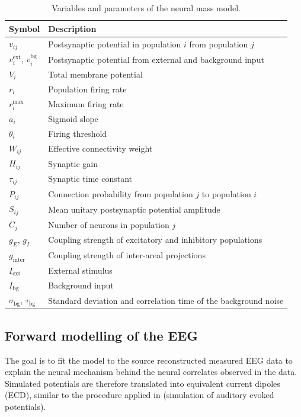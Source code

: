 \documentclass[11pt,a4paper,onecolumn]{article}
\begin{document}
\begin{table}[H]
\caption{Variables and parameters of the neural mass model.}
\label{tab:symbols}
\centering
\begin{tabular}{ll}
\toprule
Symbol & Description\\
\midrule
$v_{ij}$ & Postsynaptic potential in population $i$ from population $j$\\
$v_i^{\mathrm{ext}}$, $v_i^{\mathrm{bg}}$ & Postsynaptic potential from external and background input\\
$V_i$ & Total membrane potential\\
$r_i$ & Population firing rate\\
$r_i^{\max}$ & Maximum firing rate\\
$a_i$ & Sigmoid slope\\
$\theta_i$ & Firing threshold\\
$W_{ij}$ & Effective connectivity weight\\
$H_{ij}$ & Synaptic gain\\
$\tau_{ij}$ & Synaptic time constant\\
$P_{ij}$ & Connection probability from population $j$ to population $i$\\
$S_{ij}$ & Mean unitary postsynaptic potential amplitude\\
$C_j$ & Number of neurons in population $j$\\
$g_E$, $g_I$ & Coupling strength of excitatory and inhibitory populations\\
$g_{\mathrm{inter}}$ & Coupling strength of inter-areal projections\\
$I_{\mathrm{ext}}$ & External stimulus\\
$I_{\mathrm{bg}}$ & Background input\\
$\sigma_{\mathrm{bg}}$, $\tau_{\mathrm{bg}}$ & Standard deviation and correlation time of the background noise\\
\bottomrule
\end{tabular}
\end{table}

\subsection*{Forward modelling of the EEG}
\vspace{-7pt}

The goal is to fit the model to the source reconstructed measured EEG data to explain the neural mechanism behind the neural correlates observed in the data. Simulated potentials are therefore translated into equivalent current dipoles (ECD), similar to the procedure applied in \cite{chienLaminarNeuralDynamics2023} (simulation of auditory evoked potentials).
\end{document}
